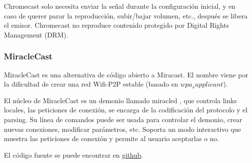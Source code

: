 Chromecast solo necesita enviar la señal durante la configuración inicial, y en caso de querer parar la reproducción, subir/bajar volumen, etc., después se libera el emisor.
Chromecast no reproduce contenido protegido por Digital Rights Management (DRM).



\subsubsection{MiracleCast}
MiracleCast es una alternativa de código abierto a Miracast. El nombre viene por la dificultad de crear una red Wifi-P2P estable (basado en $wpa_supplicant$).

El núcleo de MiracleCast es un demonio llamado miracled \cite{MiracleCast}, que controla links locales, las peticiones de conexión, se encarga de
la codificación del protocolo y el parsing.
Su línea de comandos puede ser usada para controlar el demonio, crear nuevas conexiones, modificar parámetros, etc.
Soporta un modo interactivo que muestra las peticiones de conexión y permite al usuario aceptarlas o no.

El código fuente se puede encontrar en \href{https://github.com/albfan/miraclecast}{github}.